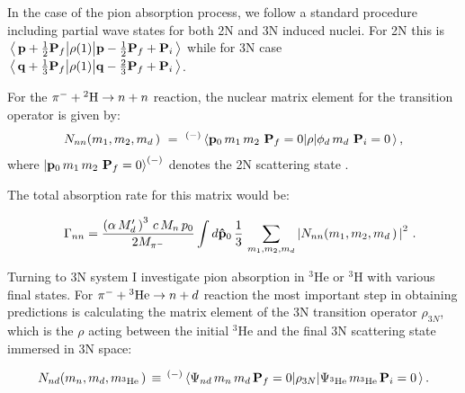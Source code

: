     In the case of the pion absorption process, we follow a standard procedure
    including partial wave states for both 2N and 3N induced nuclei.
    For 2N this is 
    $ \matrixel{\, {\bf p} + \frac12{\bf P}_f } 
    {\rho (1) }{ {\bf p} - \frac12{\bf P}_f + {\bf P}_i \, }$
    while for 3N case
    $\matrixel {\, {\bf q} + \frac13{\bf P}_f}  
    {\rho(1)} {{\bf q} - \frac23{\bf P}_f + {\bf P}_i \,}$.

    For the $\pi^- + {^2{\rm H}} \rightarrow n + n $ reaction,
    the nuclear matrix element for the transition operator is given by:
    \begin{eqnarray}
        N_{nn} (m_1, m_2, m_d \, ) \ = \
   ^{(-)}\matrixel{ {\bf p}_0 \, m_{1} \, m_2 \ {\bf P}_f=0 } 
   {\rho } {\phi_d \, m_d \ {\bf P}_i=0 \, },
   \label{nnn1}
   \end{eqnarray}
   where $ \ket{  {\bf p}_0 \, m_{1} \, m_2 \ {\bf P}_f=0  }^{(-)}  $ denotes the 2N scattering state \cite{Golak2018}.

   The total absorption rate for this matrix would be:

   \begin{eqnarray}
        &&\Gamma_{nn} = 
    \frac{ \left( \alpha \, M^\prime_d \, \right)^3 \, c \, M_n \, p_0 }{ 2 M_{\pi^-} }
        \int d {\bf\hat p}_0 \,
        \frac13 \, 
        \sum\limits_{m_1, m_2, m_d} 
        \left| 
        N_{nn} (m_1, m_2, m_d \, ) \, 
        \right|^2  \, .
    \label{gnn1}
    \end{eqnarray} 

    Turning to 3N system I investigate pion absorption in $^3$He or $^3$H
    with various final states.
    For $\pi^- + {^3{\rm He}} \rightarrow n + d $ reaction the most important step in 
    obtaining predictions is calculating
    the matrix element
    of the 3N transition operator $\rho_{3N}$,
     which is the $\rho$ acting between the initial $^3$He and the final 3N scattering state immersed in 3N space:

    \begin{eqnarray}  
        N_{nd} (m_n, m_d , m_{^3{\rm He}}  \, )  \, \equiv \, 
        {}^{(-)}\matrixel{\Psi_{nd}  \, 
            m_n \, m_d \,
            {\bf P}_f=0 
            } {\rho_{3N} }
        {\Psi_{^3{\rm He}} \, m_{^3{\rm He}} \, {\bf P}_i=0 \, }.
        \label{nnd}
    \end{eqnarray}

